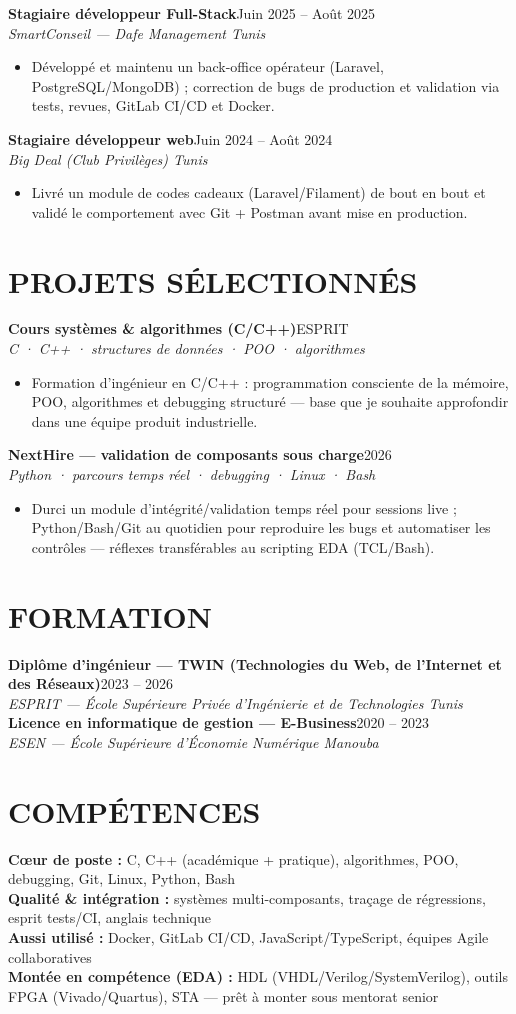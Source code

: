 \documentclass[10pt,a4paper]{article}
\newcommand{\job}[3]{%
  \textbf{\color{primary}#1}\hfill{\color{muted}\small #2}\\[-1pt]
  {\color{accent}\textit{#3}}\\[1pt]
  \begin{itemize}
}
\newcommand{\proj}[3]{%
  \textbf{\color{primary}#1}\hfill{\color{muted}\small #2}\\[-1pt]
  {\color{accent}\textit{#3}}\\[0.5pt]
  \begin{itemize}
}
\newcommand{\edu}[3]{%
  \textbf{\color{primary}#1}\hfill{\color{muted}\small #2}\\[-1pt]
  {\color{accent}\textit{#3}}\\[2pt]
}
\begin{document}
\job{Stagiaire développeur Full-Stack}{Juin 2025 -- Août 2025}{SmartConseil — Dafe Management \textbar{} Tunis}
  \item Développé et maintenu un back-office opérateur (Laravel, PostgreSQL/MongoDB) ; correction de bugs de production et validation via tests, revues, GitLab CI/CD et Docker.
\end{itemize}

\job{Stagiaire développeur web}{Juin 2024 -- Août 2024}{Big Deal (Club Privilèges) \textbar{} Tunis}
  \item Livré un module de codes cadeaux (Laravel/Filament) de bout en bout et validé le comportement avec Git + Postman avant mise en production.
\end{itemize}

\section{PROJETS SÉLECTIONNÉS}
{\footnotesize
\proj{Cours systèmes \& algorithmes (C/C++)}{ESPRIT}{C · C++ · structures de données · POO · algorithmes}
  \item Formation d'ingénieur en C/C++ : programmation consciente de la mémoire, POO, algorithmes et debugging structuré — base que je souhaite approfondir dans une équipe produit industrielle.
\end{itemize}
\proj{NextHire — validation de composants sous charge}{2026}{Python · parcours temps réel · debugging · Linux · Bash}
  \item Durci un module d'intégrité/validation temps réel pour sessions live ; Python/Bash/Git au quotidien pour reproduire les bugs et automatiser les contrôles — réflexes transférables au scripting EDA (TCL/Bash).
\end{itemize}
}

\section{FORMATION}
\edu{Diplôme d'ingénieur — TWIN (Technologies du Web, de l'Internet et des Réseaux)}{2023 -- 2026}{ESPRIT — École Supérieure Privée d'Ingénierie et de Technologies \textbar{} Tunis}
\edu{Licence en informatique de gestion — E-Business}{2020 -- 2023}{ESEN — École Supérieure d'Économie Numérique \textbar{} Manouba}

\section{COMPÉTENCES}
{\small
\textbf{\color{primary}Cœur de poste :} C, C++ (académique + pratique), algorithmes, POO, debugging, Git, Linux, Python, Bash\\[1pt]
\textbf{\color{primary}Qualité \& intégration :} systèmes multi-composants, traçage de régressions, esprit tests/CI, anglais technique\\[1pt]
\textbf{\color{primary}Aussi utilisé :} Docker, GitLab CI/CD, JavaScript/TypeScript, équipes Agile collaboratives\\[1pt]
\textbf{\color{primary}Montée en compétence (EDA) :} HDL (VHDL/Verilog/SystemVerilog), outils FPGA (Vivado/Quartus), STA — prêt à monter sous mentorat senior
}
\end{document}
